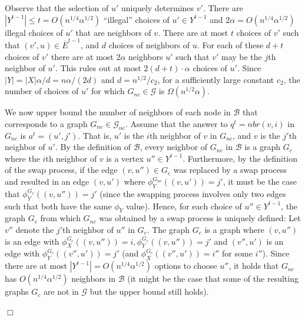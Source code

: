 \documentclass{article}
\newcommand{\calB}{{\mathcal{B}}}
\newcommand{\calD}{{\mathcal{D}}}
\newcommand{\calG}{{\mathcal{G}}}
\newenvironment{proof}{\smallskip\noindent{\bf Proof:}}%
        {\hspace*{\fill}$\Box$\par}
\newcommand{\ForFuture}[1]{}
\begin{document}
\begin{proof}
    Observe that the selection of $u'$ uniquely determines $v'$.
    There are $|Y^{t-1}| \leq t = O(n^{1/4}\alpha^{1/2})$ ``illegal'' choices of $u' \in Y^{t-1}$ and $2\alpha = O(n^{1/4}\alpha^{1/2})$ illegal choices of $u'$ that are neighbors of $v$. There are at most $t$ choices of $v'$ such that $(v',u)\in \overline{E}^{t-1}$, and $d$ choices of neighbors of $u$. For each of these $d+t$ choices of $v'$ there are at most $2\alpha$ neighbors $u'$ such that $v'$ may be the $j$th neighbor of $u'$. This rules out at most $2(d+t)\cdot\alpha$ choices of $u'$.
    Since $|Y|=|X|\alpha/d = n\alpha/(2d)$  \ForFuture{D: Be precise} and $d = n^{1/2}/c_2$, for a sufficiently large constant $c_2$, the number of choices of $u'$ for which $G_{nc} \in \calG$ is $\Omega(n^{1/2}\alpha)$.

    We now upper bound the number of neighbors of each node  in $\calB$ that corresponds to a graph $G_{nc} \in \calG_{nc}$.
    Assume that the answer to $q^t=nbr(v,i)$ in $G_{nc}$ is $a^t=(u',j')$. That is, $u'$ is the $i$th neighbor of $v$ in $G_{nc}$, and $v$ is the $j'$th neighbor of $u'$.
      By the definition of $\calB$, every neighbor of $G_{nc}$ in $\calB$ is a graph $G_{c}$ where the $i$th neighbor of $v$ is a vertex $u''\in Y^{t-1}$. Furthermore, by the definition of the swap process, if the edge $(v,u'')\in G_c$ was replaced by a swap process and resulted in an edge $(v,u')$ where $\phi^{G_{nc}}_Y((v,u'))=j'$, it must be the case that $\phi^{G_c}_{Y}((v,u''))=j'$ (since the swapping process  involves only two edges such that both have the same $\phi_Y$ value). Hence, for each choice of $u''\in Y^{t-1}$, the graph $G_c$ from which $G_{nc}$ was obtained by a swap process is uniquely defined:
      Let $v''$ denote the $j'$th neighbor of $u''$ in $G_c$.
      The graph $G_c$ is a graph where
      $(v,u'')$ is an edge with $\phi^{G_c}_{X}((v,u''))=i, \phi^{G_c}_Y((v,u''))=j'$ and $(v'', u')$ is an edge with $\phi^{G_c}_Y((v'', u'))=j'$ (and $\phi^{G_c}_X((v'', u'))=i''$ for some $i''$). Since there are at most $|Y^{t-1}|=O(n^{1/4}\alpha^{1/2})$ options to choose $u''$, it holds that $G_{nc}$ has $O(n^{1/4}\alpha^{1/2})$ neighbors in $\calB$ (it might be the case that some of the resulting graphs $G_c$ are not in
      $\calG$
      but the upper bound still holds). \ForFuture{D: doublecheck superscripts to $\phi$ (and other indices}


\end{proof}
\end{document}
